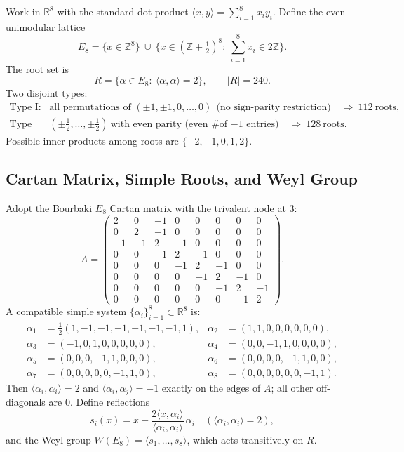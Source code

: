 \documentclass[12pt]{article}
\begin{document}
Work in $\mathbb{R}^8$ with the standard dot product $\langle x,y\rangle=\sum_{i=1}^8 x_i y_i$.
Define the even unimodular lattice
\[
E_8=\{x\in\mathbb{Z}^8\}\ \cup\ \bigl\{x\in(\mathbb{Z}+\tfrac12)^8:\ \textstyle\sum_{i=1}^8 x_i\in 2\mathbb{Z}\bigr\}.
\]
The root set is
\[
R=\{\alpha\in E_8:\ \langle \alpha,\alpha\rangle=2\},\qquad |R|=240.
\]
Two disjoint types:
\begin{align*}
\text{Type I: }&\text{all permutations of }(\pm1,\pm1,0,\dots,0)\ \ \text{(no sign-parity restriction)}\quad\Rightarrow\ 112\ \text{roots},\\
\text{Type II: }&(\pm\tfrac12,\dots,\pm\tfrac12)\ \text{with even parity (even \# of $-1$ entries)}\quad\Rightarrow\ 128\ \text{roots}.
\end{align*}
Possible inner products among roots are $\{-2,-1,0,1,2\}$.


\subsection{Cartan Matrix, Simple Roots, and Weyl Group}
Adopt the Bourbaki $E_8$ Cartan matrix with the trivalent node at $3$:
\[
A=\begin{pmatrix}
2&0&-1&0&0&0&0&0\\
0&2&-1&0&0&0&0&0\\
-1&-1&2&-1&0&0&0&0\\
0&0&-1&2&-1&0&0&0\\
0&0&0&-1&2&-1&0&0\\
0&0&0&0&-1&2&-1&0\\
0&0&0&0&0&-1&2&-1\\
0&0&0&0&0&0&-1&2
\end{pmatrix}.
\]
A compatible simple system $\{\alpha_i\}_{i=1}^8\subset\mathbb{R}^8$ is:
\[
\begin{aligned}
\alpha_1&=\tfrac12(1,-1,-1,-1,-1,-1,-1,1),&
\alpha_2&=(1,1,0,0,0,0,0,0),\\
\alpha_3&=(-1,0,1,0,0,0,0,0),&
\alpha_4&=(0,0,-1,1,0,0,0,0),\\
\alpha_5&=(0,0,0,-1,1,0,0,0),&
\alpha_6&=(0,0,0,0,-1,1,0,0),\\
\alpha_7&=(0,0,0,0,0,-1,1,0),&
\alpha_8&=(0,0,0,0,0,0,-1,1).
\end{aligned}
\]
Then $\langle\alpha_i,\alpha_i\rangle=2$ and $\langle\alpha_i,\alpha_j\rangle=-1$ exactly on the edges of $A$; all other off-diagonals are $0$.
Define reflections
\[
s_i(x)=x-\frac{2\langle x,\alpha_i\rangle}{\langle\alpha_i,\alpha_i\rangle}\,\alpha_i
\quad(\langle\alpha_i,\alpha_i\rangle=2),
\]
and the Weyl group $W(E_8)=\langle s_1,\dots,s_8\rangle$, which acts transitively on $R$.
\end{document}
